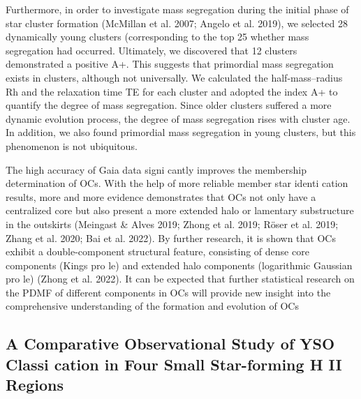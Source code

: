 \documentclass[../main.tex]{subfiles}
\begin{document}
{Furthermore, in order to investigate mass segregation during
the initial phase of star cluster formation (McMillan et al. 2007;
Angelo et al. 2019), we selected 28 dynamically young clusters
(corresponding to the top 25%
whether mass segregation had occurred. Ultimately, we
discovered that 12 clusters demonstrated a positive A+. This
suggests that primordial mass segregation exists in clusters,
although not universally.
We calculated the half-mass–radius Rh and the relaxation
time TE for each cluster and adopted the index A+ to
quantify the degree of mass segregation. Since older
clusters suffered a more dynamic evolution process, the
degree of mass segregation rises with cluster age. In
addition, we also found primordial mass segregation in
young clusters, but this phenomenon is not ubiquitous.

The high accuracy of Gaia data signi cantly improves the
membership determination of OCs. With the help of more
reliable member star identi cation results, more and more
evidence demonstrates that OCs not only have a centralized
core but also present a more extended halo or lamentary
substructure in the outskirts (Meingast & Alves 2019; Zhong
et al. 2019; Röser et al. 2019; Zhang et al. 2020; Bai et al.
2022). By further research, it is shown that OCs exhibit a
double-component structural feature, consisting of dense core
components (Kings pro le) and extended halo components
(logarithmic Gaussian pro le) (Zhong et al. 2022). It can be
expected that further statistical research on the PDMF of
different components in OCs will provide new insight into the
comprehensive understanding of the formation and evolution
of OCs

\subsection{A Comparative Observational Study of YSO Classi cation
	in Four Small Star-forming H II Regions}


}
\end{document}
